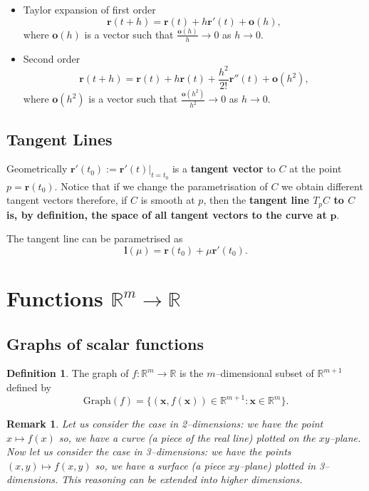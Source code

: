 \documentclass[12pt, a4paper]{article}
\newcommand{\bb}[1]{\mathbb{#1}}
\newcommand{\f}[2]{\frac{#1}{#2}}
\newcommand{\mb}[1]{\mathbf{#1}}
\newtheorem*{remark}{Remark}
\theoremstyle{definition}
\newtheorem{definition}{Definition}[section]
\theoremstyle{plain}
\begin{document}
\begin{itemize}

	\item Taylor expansion of first order $$\mathbf{r}(t+h) = \mathbf{r}(t) + h\mathbf{r}'(t) + \mathbf{o}(h),$$ where $\mb{o}(h)$ is a vector such that $\f{\mb{o}(h)}{h}\to 0$ as $h\to 0.$

	\item Second order $$\mathbf{r}(t+h)=\mathbf{r}(t)+h\mathbf{r}(t)+ \frac{h^2}{2!}\mathbf{r}''(t)+\mathbf{o}(h^2),$$ where $\mb{o}(h^2)$ is a vector such that $\f{\mb{o}(h^2)}{h^2}\to 0$ as $h\to 0.$

\end{itemize}

\subsection{Tangent Lines}

Geometrically $\mathbf{r}'(t_0) := \mathbf{r}'(t)|_{t=t_0}$ is a \textbf{tangent vector} to $C$ at the point $p = \mathbf{r}(t_0).$ Notice that if we change the parametrisation of $C$ we obtain different tangent vectors therefore, if $C$ is smooth at $p$, then the \textbf{tangent line $T_pC$ to $C$ is, by definition, the space of all tangent vectors to the curve at }$\mathbf{p.}$

\begin{tcolorbox}
The tangent line can be parametrised as $$\mathbf{l}(\mu) = \mathbf{r}(t_0) + \mu \mathbf{r}'(t_0).$$
\end{tcolorbox}

\section{Functions \texorpdfstring{$\bb{R}^m \to \bb{R}$}{TEXT}}

\subsection{Graphs of scalar functions}

\begin{definition}
The graph of $f : \bb{R}^m \to \bb{R}$ is the $m$--dimensional subset of $\bb{R}^{m+1}$ defined by $$\text{Graph}(f) = \{(\mathbf{x}, f(\mathbf{x})) \in \bb{R}^{m+1} : \mathbf{x} \in \bb{R}^m\} .$$
\end{definition}

\begin{remark}
Let us consider the case in 2--dimensions: we have the point $x \mapsto f(x)$ so, we have a curve (a piece of the real line) plotted on the $xy$--plane. Now let us consider the case in 3--dimensions: we have the points $(x,y) \mapsto f(x,y)$ so, we have a surface (a piece $xy$--plane) plotted in 3--dimensions. This reasoning can be extended into higher dimensions.
\end{remark} 
\end{document}
